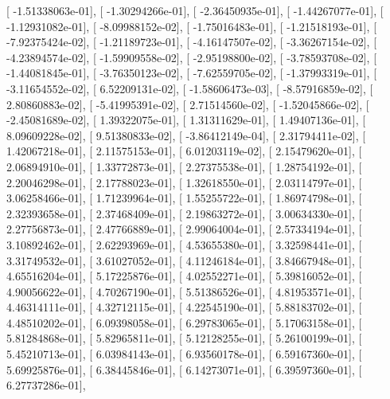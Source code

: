 \documentclass{article}
\begin{document}
       [ -1.51338063e-01],
       [ -1.30294266e-01],
       [ -2.36450935e-01],
       [ -1.44267077e-01],
       [ -1.12931082e-01],
       [ -8.09988152e-02],
       [ -1.75016483e-01],
       [ -1.21518193e-01],
       [ -7.92375424e-02],
       [ -1.21189723e-01],
       [ -4.16147507e-02],
       [ -3.36267154e-02],
       [ -4.23894574e-02],
       [ -1.59909558e-02],
       [ -2.95198800e-02],
       [ -3.78593708e-02],
       [ -1.44081845e-01],
       [ -3.76350123e-02],
       [ -7.62559705e-02],
       [ -1.37993319e-01],
       [ -3.11654552e-02],
       [  6.52209131e-02],
       [ -1.58606473e-03],
       [ -8.57916859e-02],
       [  2.80860883e-02],
       [ -5.41995391e-02],
       [  2.71514560e-02],
       [ -1.52045866e-02],
       [ -2.45081689e-02],
       [  1.39322075e-01],
       [  1.31311629e-01],
       [  1.49407136e-01],
       [  8.09609228e-02],
       [  9.51380833e-02],
       [ -3.86412149e-04],
       [  2.31794411e-02],
       [  1.42067218e-01],
       [  2.11575153e-01],
       [  6.01203119e-02],
       [  2.15479620e-01],
       [  2.06894910e-01],
       [  1.33772873e-01],
       [  2.27375538e-01],
       [  1.28754192e-01],
       [  2.20046298e-01],
       [  2.17788023e-01],
       [  1.32618550e-01],
       [  2.03114797e-01],
       [  3.06258466e-01],
       [  1.71239964e-01],
       [  1.55255722e-01],
       [  1.86974798e-01],
       [  2.32393658e-01],
       [  2.37468409e-01],
       [  2.19863272e-01],
       [  3.00634330e-01],
       [  2.27756873e-01],
       [  2.47766889e-01],
       [  2.99064004e-01],
       [  2.57334194e-01],
       [  3.10892462e-01],
       [  2.62293969e-01],
       [  4.53655380e-01],
       [  3.32598441e-01],
       [  3.31749532e-01],
       [  3.61027052e-01],
       [  4.11246184e-01],
       [  3.84667948e-01],
       [  4.65516204e-01],
       [  5.17225876e-01],
       [  4.02552271e-01],
       [  5.39816052e-01],
       [  4.90056622e-01],
       [  4.70267190e-01],
       [  5.51386526e-01],
       [  4.81953571e-01],
       [  4.46314111e-01],
       [  4.32712115e-01],
       [  4.22545190e-01],
       [  5.88183702e-01],
       [  4.48510202e-01],
       [  6.09398058e-01],
       [  6.29783065e-01],
       [  5.17063158e-01],
       [  5.81284868e-01],
       [  5.82965811e-01],
       [  5.12128255e-01],
       [  5.26100199e-01],
       [  5.45210713e-01],
       [  6.03984143e-01],
       [  6.93560178e-01],
       [  6.59167360e-01],
       [  5.69925876e-01],
       [  6.38445846e-01],
       [  6.14273071e-01],
       [  6.39597360e-01],
       [  6.27737286e-01],
\end{document}
